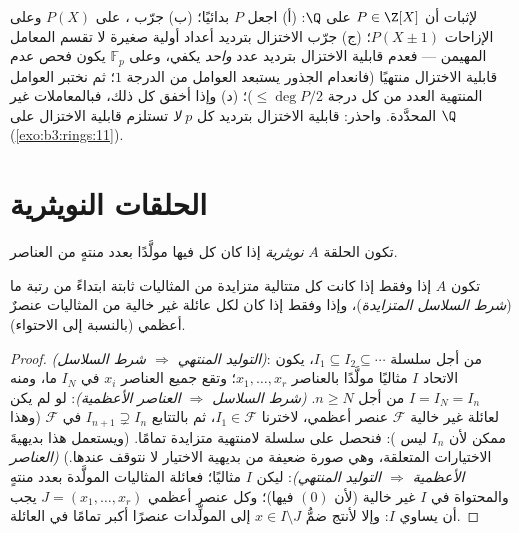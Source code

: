 \begin{method}\label{met:b3:rings:irreducibility}
لإثبات أن $P \in \Z[X]$  على $\Q$: (أ) اجعل
$P$ بدائيًا؛ (ب) جرّب ، على $P(X)$ وعلى الإزاحات
$P(X \pm
1)$؛ (ج) جرّب الاختزال بترديد أعداد أولية صغيرة لا تقسم
المعامل المهيمن --- فعدم قابلية الاختزال بترديد عدد 
\emph{واحد} يكفي، وعلى $\mathbb F_p$ يكون فحص عدم قابلية
الاختزال منتهيًا (فانعدام الجذور يستبعد العوامل من الدرجة $1$؛
ثم نختبر العوامل المنتهية العدد من كل درجة $\leq \deg P/2$)؛
(د) وإذا أخفق كل ذلك، فبالمعاملات غير المحدَّدة. واحذر: قابلية
الاختزال بترديد كل $p$ \emph{لا} تستلزم قابلية الاختزال على $\Q$
(\cref{exo:b3:rings:11}).
\end{method}

\section{الحلقات النويثرية}

\begin{definition}\label{def:b3:rings:noetherian}
تكون الحلقة $A$ \emph{نويثرية} إذا كان كل
 فيها مولَّدًا بعدد منتهٍ من العناصر.
\end{definition}

\begin{proposition}\label{prop:b3:rings:noethacc}
تكون $A$  إذا وفقط إذا كانت كل متتالية متزايدة من
المثاليات ثابتة ابتداءً من رتبة ما (\emph{شرط السلاسل
المتزايدة})، وإذا وفقط إذا كان لكل عائلة غير خالية من المثاليات
عنصرٌ أعظمي (بالنسبة إلى الاحتواء).
\end{proposition}

\begin{proof}
\emph{(التوليد المنتهي $\Rightarrow$ شرط السلاسل)}: من أجل
سلسلة $I_1 \subseteq I_2
\subseteq \cdots$، يكون الاتحاد $I$ مثاليًا مولَّدًا بالعناصر $x_1,
\dots, x_r$؛
وتقع جميع العناصر $x_i$ في $I_N$ ما، ومنه $I = I_N = I_n$ من
أجل $n \geq N$. \emph{(شرط السلاسل $\Rightarrow$ العناصر
الأعظمية)}: لو لم يكن لعائلة غير خالية $\mathcal F$ عنصر أعظمي،
لاخترنا $I_1 \in
\mathcal F$، ثم بالتتابع $I_{n+1} \supsetneq I_n$ في $\mathcal F$ (وهذا ممكن
لأن $I_n$ ليس ): فنحصل على سلسلة لامنتهية متزايدة تمامًا.
(ويستعمل هذا بديهيةَ الاختيارات المتعلقة، وهي صورة ضعيفة من
بديهية الاختيار لا نتوقف عندها.) \emph{(العناصر الأعظمية
$\Rightarrow$ التوليد المنتهي)}: ليكن $I$ مثاليًا؛ فعائلة
المثاليات المولَّدة بعدد منتهٍ والمحتواة في $I$ غير خالية (لأن
$(0)$ فيها)؛ وكل عنصر أعظمي $J = (x_1, \dots, x_r)$ يجب أن يساوي $I$: وإلا
لأنتج ضمُّ $x \in I \setminus J$ إلى المولِّدات عنصرًا أكبر تمامًا في العائلة.
\end{proof}

